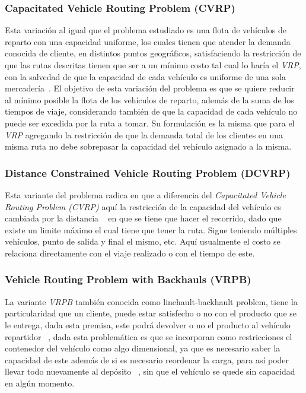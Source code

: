 \documentclass[letter, 10pt]{article}
\begin{document}
\subsubsection{Capacitated Vehicle Routing Problem (CVRP)}
Esta variaci\'on al igual que el problema estudiado es una flota de veh\'iculos de reparto con una capacidad uniforme, los cuales 
tienen que atender la demanda conocida de cliente, en distintos puntos geogr\'aficos, satisfaciendo la restricci\'on de que las rutas descritas tienen
que ser a un m\'inimo costo tal cual lo har\'ia el \emph{VRP}, con la salvedad de que la capacidad de cada veh\'iculo es 
uniforme de una sola mercader\'ia~\cite{CVRP}.
\newline
El objetivo de esta variaci\'on del problema es que se quiere reducir al m\'inimo posible la flota de los veh\'iculos de reparto, adem\'as 
de la suma de los tiempos de viaje, considerando tambi\'en de que la capacidad de cada veh\'iculo no puede ser excedida por la ruta a tomar.
Su formulaci\'on es la misma que para el \emph{VRP} agregando la restricci\'on de que la demanda total de los clientes en una misma ruta
no debe sobrepasar la capacidad del veh\'iculo asignado a la misma.


\subsubsection{Distance Constrained Vehicle Routing Problem (DCVRP)}

Esta variante del problema radica en que a diferencia del \emph{Capacitated Vehicle Routing Problem (CVRP)} aqu\'i la restricci\'on de la capacidad
del veh\'iculo es cambiada por la distancia ~\cite{TSP} en que se tiene que hacer el recorrido, dado que existe un limite m\'aximo el cual 
tiene que tener la ruta. Sigue teniendo m\'ultiples veh\'iculos, punto de salida y final el mismo, etc.
Aqu\'i usualmente el costo se relaciona directamente con el viaje realizado o con el tiempo de este.


\subsubsection{Vehicle Routing Problem with Backhauls (VRPB)}

La variante \emph{VRPB} tambi\'en conocida como linehault-backhault problem, tiene la particularidad que un cliente, puede estar satisfecho o no
con el producto que se le entrega, dada esta premisa, este podr\'a devolver o no el producto al veh\'iculo repartidor ~\cite{Prosser93Hybrid}, 
dada esta problem\'atica
es que se incorporan como restricciones el contenedor del veh\'iculo como algo dimensional, ya que es necesario saber la capacidad 
de este adem\'as 
de si es necesario reordenar la carga, para as\'i poder llevar todo nuevamente al dep\'osito ~\cite{Prosser93Hybrid}, sin que el veh\'iculo se quede sin capacidad en alg\'un 
momento.
\end{document}
